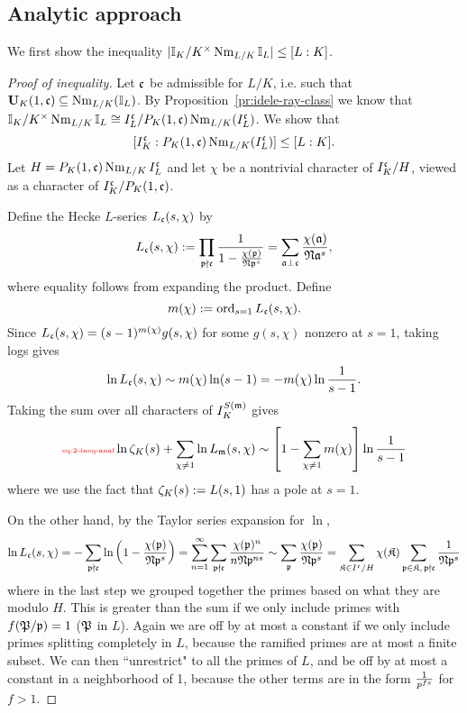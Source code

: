 \subsection{Analytic approach}
We first show the inequality $|\mathbb{I}_K/K^{\times}\operatorname{Nm}_{L/K}\mathbb{I}_L|\le [L:K]$.
\begin{proof}[Proof of inequality]
Let $\mathfrak{c}$ be admissible for $L/K$, i.e. such that $\mathbf U_K(1,\mathfrak{c})\subseteq \operatorname{Nm}_{L/K}(\mathbb{I}_L)$.
By Proposition~\ref{pr:idele-ray-class} we know that $\mathbb{I}_K/K^{\times}\operatorname{Nm}_{L/K}\mathbb{I}_L\cong I_L^{\mathfrak{c}}/P_{K}(1,{\mathfrak{c}})\operatorname{Nm}_{L/K}(I_L^{\mathfrak{c}})$. We show that
\[
[I_K^{\mathfrak{c}}:P_K(1,{\mathfrak{c}})\operatorname{Nm}_{L/K}(I_L^{\mathfrak{c}})]\le [L:K].
\]
Let $H=P_K(1,{\mathfrak{c}})\operatorname{Nm}_{L/K}I_L^{\mathfrak{c}}$ and let $\chi$ be a nontrivial character of $I_K^{\mathfrak{c}}/H$, viewed as a character of $I_K^{\mathfrak{c}}/P_K(1,{\mathfrak{c}})$. 

Define the Hecke $L$-series $L_{\mathfrak{c}}(s,\chi)$ by
\[
L_{\mathfrak{c}}(s,\chi):=\prod_{\mathfrak{p}\nmid \mathfrak{c}} \frac{1}{1-\frac{\chi(\mathfrak{p})}{\mathfrak{N} \mathfrak{p}^s}}=\sum_{\mathfrak{a}\perp\mathfrak{c}}\frac{\chi(\mathfrak{a})}{\mathfrak{N}\mathfrak{a}^s},
\]
where equality follows from expanding the product.
Define
\[
m(\chi):=\operatorname{ord}_{s=1} L_{\mathfrak{c}}(s,\chi).
\]
Since $L_{\mathfrak{c}}(s,\chi)=(s-1)^{m(\chi)}g(s,\chi)$ for some $g(s,\chi)$ nonzero at $s=1$, taking logs gives
\[
\ln L_{\mathfrak{c}}(s,\chi)\sim m(\chi)\ln(s-1)=-m(\chi)\ln \frac{1}{s-1}.
\]
Taking the sum over all characters of $I_K^{S(\mathfrak{m})}$ gives
\begin{equation}\llabel{eq:2-ineq-anal}
\ln \ze_K(s)+\sum_{\chi\ne 1}\ln L_{\mm}(s,\chi)
\sim
\ba{1-\sum_{\chi\ne 1}m(\chi)}\ln\rc{s-1}
\end{equation}
where we use the fact that $\zeta_K(s):=L(s,1)$ has a pole at $s=1$.

On the other hand, by the Taylor series expansion for $\ln$,
\[
\ln L_{\mathfrak{c}}(s,\chi)=-\sum_{\mathfrak{p}\nmid \mathfrak{c}}^{}\ln \left( {1-\frac{\chi(\mathfrak{p})}{\mathfrak{N} \mathfrak{p}^s}} \right)=
\sum_{n=1}^{\infty}\sum_{\mathfrak{p}\nmid \mathfrak{c}} \frac{\chi(\mathfrak{p})^n}{n\mathfrak{N} \mathfrak{p}^{ns}}\sim\sum_{\mathfrak{p}}\frac{\chi(\mathfrak{p})}{\mathfrak{N} \mathfrak{p}^s}
=
\sum_{\mathfrak K\in I^{\mathfrak{c}}/H} \chi(\mathfrak K)\sum_{\mathfrak{p}\in \mathfrak K,\,\mathfrak{p}\nmid \mathfrak{c}}\frac{1}{\mathfrak{N}\mathfrak{p}^s}
\]
where in the last step we grouped together the primes based on what they are modulo $H$. This is greater than the sum if we only include primes with $f(\mathfrak{P}/\mathfrak{p})=1$ ($\mathfrak{P}$ in $L$). %
Again we are off by at most a constant if we only include primes splitting completely in $L$, because the ramified primes are at most a finite subset. 
We can then ``unrestrict" to all the primes of $L$, and be off by at most a constant in a neighborhood of 1, because the other terms are in the form $\frac{1}{p^{fs}}$ for $f>1$.


\end{proof}
